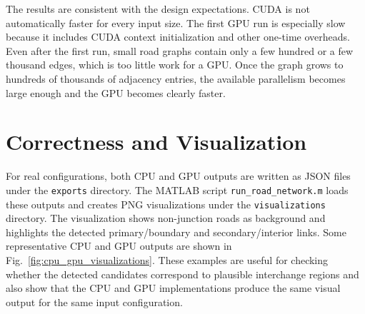 \documentclass[conference]{IEEEtran}
\begin{document}
\begin{table}[htbp]
\caption{Runtime Results for All Configurations}
\label{tab:results}
\centering
\scriptsize
{}
\end{table}


The results are consistent with the design expectations. CUDA is not automatically faster for every input size. The first GPU run is especially slow because it includes CUDA context initialization and other one-time overheads. Even after the first run, small road graphs contain only a few hundred or a few thousand edges, which is too little work for a GPU. Once the graph grows to hundreds of thousands of adjacency entries, the available parallelism becomes large enough and the GPU becomes clearly faster.

\section{Correctness and Visualization}

For real configurations, both CPU and GPU outputs are written as JSON files under the \texttt{exports} directory. The MATLAB script \texttt{run\_road\_network.m} loads these outputs and creates PNG visualizations under the \texttt{visualizations} directory. The visualization shows non-junction roads as background and highlights the detected primary/boundary and secondary/interior links. Some representative CPU and GPU outputs are shown in Fig.~\ref{fig:cpu_gpu_visualizations}. These examples are useful for checking whether the detected candidates correspond to plausible interchange regions and also show that the CPU and GPU implementations produce the same visual output for the same input configuration.
\end{document}
